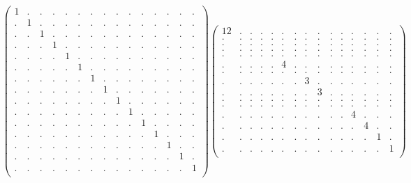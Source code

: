 \documentclass[12pt,a4paper]{amsart}
\begin{document}
\begin{align*}
\left(\begin{array}{rrrrrrrrrrrrrrr}%
1&.&.&.&.&.&.&.&.&.&.&.&.&.&.\\%
.&1&.&.&.&.&.&.&.&.&.&.&.&.&.\\%
.&.&1&.&.&.&.&.&.&.&.&.&.&.&.\\%
.&.&.&1&.&.&.&.&.&.&.&.&.&.&.\\%
.&.&.&.&1&.&.&.&.&.&.&.&.&.&.\\%
.&.&.&.&.&1&.&.&.&.&.&.&.&.&.\\%
.&.&.&.&.&.&1&.&.&.&.&.&.&.&.\\%
.&.&.&.&.&.&.&1&.&.&.&.&.&.&.\\%
.&.&.&.&.&.&.&.&1&.&.&.&.&.&.\\%
.&.&.&.&.&.&.&.&.&1&.&.&.&.&.\\%
.&.&.&.&.&.&.&.&.&.&1&.&.&.&.\\%
.&.&.&.&.&.&.&.&.&.&.&1&.&.&.\\%
.&.&.&.&.&.&.&.&.&.&.&.&1&.&.\\%
.&.&.&.&.&.&.&.&.&.&.&.&.&1&.\\%
.&.&.&.&.&.&.&.&.&.&.&.&.&.&1\\%
\end{array}\right)%
\left(\begin{array}{rrrrrrrrrrrrrrr}%
12&.&.&.&.&.&.&.&.&.&.&.&.&.&.\\%
.&.&.&.&.&.&.&.&.&.&.&.&.&.&.\\%
.&.&.&.&.&.&.&.&.&.&.&.&.&.&.\\%
.&.&.&.&.&.&.&.&.&.&.&.&.&.&.\\%
.&.&.&.&.&.&.&.&.&.&.&.&.&.&.\\%
.&.&.&.&.&4&.&.&.&.&.&.&.&.&.\\%
.&.&.&.&.&.&.&.&.&.&.&.&.&.&.\\%
.&.&.&.&.&.&.&3&.&.&.&.&.&.&.\\%
.&.&.&.&.&.&.&.&3&.&.&.&.&.&.\\%
.&.&.&.&.&.&.&.&.&.&.&.&.&.&.\\%
.&.&.&.&.&.&.&.&.&.&.&.&.&.&.\\%
.&.&.&.&.&.&.&.&.&.&.&4&.&.&.\\%
.&.&.&.&.&.&.&.&.&.&.&.&4&.&.\\%
.&.&.&.&.&.&.&.&.&.&.&.&.&1&.\\%
.&.&.&.&.&.&.&.&.&.&.&.&.&.&1\\%
\end{array}\right)%
\end{align*}
\end{document}
